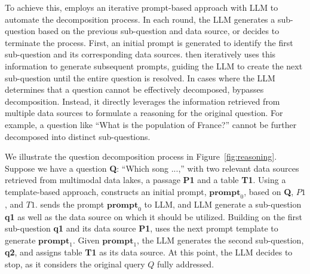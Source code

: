 
To achieve this, \sys employs an iterative prompt-based approach with LLM to automate the decomposition process. In each round, the LLM generates a sub-question based on the previous sub-question and data source, or decides to terminate the process. 
%
First, an initial prompt is generated to identify the first sub-question and its corresponding data sources. \sys then iteratively uses this information to generate subsequent prompts, guiding the LLM to create the next sub-question until the entire question is resolved. In cases where the LLM determines that a question cannot be effectively decomposed, \sys bypasses decomposition. Instead, it directly leverages the information retrieved from multiple data sources to formulate a reasoning for the original question. For example, a question like ``What is the population of France?'' cannot be further decomposed into distinct sub-questions.

We illustrate the question decomposition process in Figure~\ref{fig:reasoning}. Suppose we have a question {\bf Q}: ``Which song ...,'' with two relevant data sources retrieved from multimodal data lakes, a passage {\bf P1} and a table {\bf T1}.   Using a template-based approach, \sys constructs an initial prompt, $\mathbf{prompt}_0$, based on {\bf Q}, $P1$, and $T1$. \sys sends the prompt $\mathbf{prompt}_0$ to LLM, and LLM generate a sub-question {\bf q1} as well as the data source on which it should be utilized. Building on the first sub-question {\bf q1} and its data source {\bf P1}, \sys uses the next prompt template to generate $\mathbf{prompt}_1$. Given $\mathbf{prompt}_1$, the LLM generates the second sub-question, {\bf q2}, and assigns table {\bf T1} as its data source. 
At this point, the LLM decides to stop, as it considers the original query $Q$ fully addressed.

